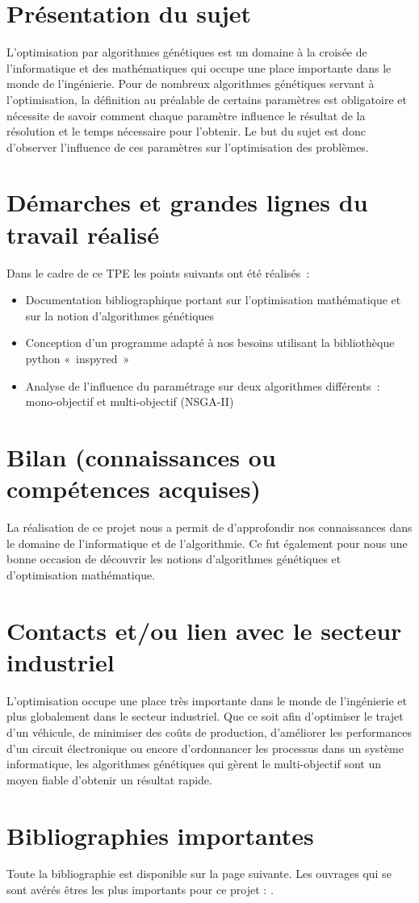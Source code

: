 \documentclass[12pt]{report}
\begin{document}
  \section{Présentation du sujet}
   L’optimisation par algorithmes génétiques est un domaine à la croisée de l’informatique et des mathématiques qui occupe une place importante dans le monde de l’ingénierie. Pour de nombreux algorithmes génétiques servant à l’optimisation, la définition au préalable de certains paramètres est obligatoire et nécessite de savoir comment chaque paramètre influence le résultat de la résolution et le temps nécessaire pour l’obtenir. Le but du sujet est donc d’observer l’influence de ces paramètres sur l’optimisation des problèmes.
  \section{Démarches et grandes lignes du travail réalisé}
  Dans le cadre de ce TPE les points suivants ont été réalisés :
  \begin{itemize}
    \item Documentation bibliographique portant sur l’optimisation mathématique et sur la notion d’algorithmes génétiques
    \item Conception d’un programme adapté à nos besoins utilisant la bibliothèque python « inspyred »
    \item Analyse de l’influence du paramétrage sur deux algorithmes différents : mono-objectif et multi-objectif (NSGA-II)
  \end{itemize}
  \section{Bilan (connaissances ou compétences acquises)}
  La réalisation de ce projet nous a permit de d’approfondir nos connaissances dans le domaine de l’informatique et de l’algorithmie. Ce fut également pour nous une bonne occasion de découvrir les notions d’algorithmes génétiques et d’optimisation mathématique.
  \section{Contacts et/ou lien avec le secteur industriel}
  L’optimisation occupe une place très importante dans le monde de l’ingénierie et plus globalement dans le secteur industriel. Que ce soit afin d'optimiser le trajet d'un véhicule, de minimiser des coûts de production, d'améliorer les performances d'un circuit électronique ou encore d'ordonnancer les processus dans un système informatique, les algorithmes génétiques qui gèrent le multi-objectif sont un moyen fiable d’obtenir un résultat rapide.
  \section{Bibliographies importantes}
  Toute la bibliographie est disponible sur la page suivante.
  Les ouvrages qui se sont avérés êtres les plus importants pour ce projet : \cite{nsga2} \cite{culiolo} \cite{inspyred}.




  \nocite{*} %
  
  
\end{document}
